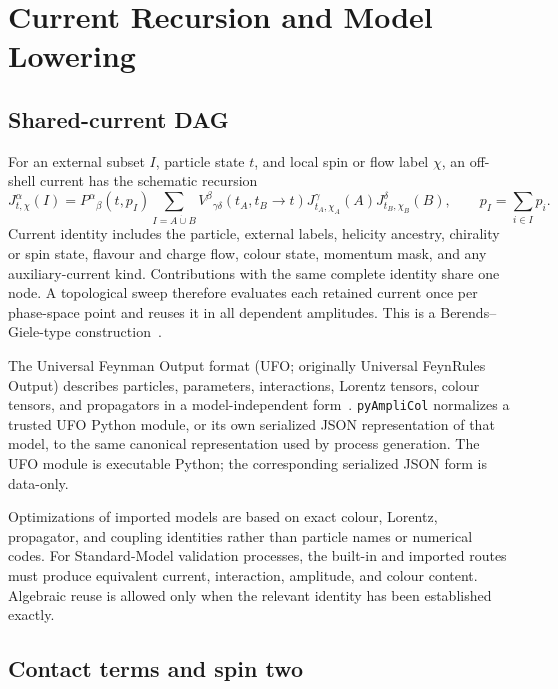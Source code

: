 \documentclass[10pt,letterpaper]{article}
\newcommand{\PAC}{\texttt{pyAmpliCol}}
\begin{document}
\section{Current Recursion and Model Lowering}

\subsection{Shared-current DAG}

For an external subset $I$, particle state $t$, and local spin or flow label
$\chi$, an off-shell current has the schematic recursion
\begin{equation}
  J^{\alpha}_{t,\chi}(I)
  = P^{\alpha}{}_{\beta}(t,p_I)
    \sum_{I=A\mathbin{\dot\cup}B}
    V^{\beta}{}_{\gamma\delta}(t_A,t_B\!\to t)
    J^{\gamma}_{t_A,\chi_A}(A)
    J^{\delta}_{t_B,\chi_B}(B),
  \qquad p_I=\sum_{i\in I}p_i .
  \label{eq:recursion}
\end{equation}
Current identity includes the particle, external labels, helicity ancestry,
chirality or spin state, flavour and charge flow, colour state, momentum mask,
and any auxiliary-current kind. Contributions with the same complete identity
share one node. A topological sweep therefore evaluates each retained current
once per phase-space point and reuses it in all dependent amplitudes.
This is a Berends--Giele-type construction~\cite{BerendsGiele1988}.

The Universal Feynman Output format (UFO; originally Universal FeynRules
Output) describes particles, parameters, interactions, Lorentz tensors,
colour tensors, and propagators in a model-independent
form~\cite{UFO2012,UFO2023}. \PAC{} normalizes a trusted UFO Python module, or
its own serialized JSON representation of that model, to the same canonical
representation used by process generation. The UFO module is executable
Python; the corresponding serialized JSON form is data-only.

Optimizations of imported models are based on exact colour, Lorentz,
propagator, and coupling identities rather than particle names or numerical
codes. For Standard-Model validation processes, the built-in and imported
routes must produce equivalent current, interaction, amplitude, and colour
content. Algebraic reuse is allowed only when the relevant identity has been
established exactly.

\subsection{Contact terms and spin two}
\end{document}
